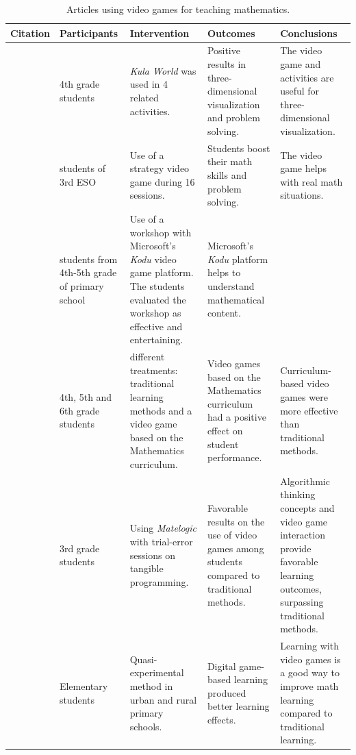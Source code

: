 \documentclass[english]{textolivre}
\begin{document}
\begin{footnotesize}
\begin{longtable}{
  >{\raggedright\arraybackslash}p{2cm}
  >{\raggedright\arraybackslash}p{2.2cm}
  >{\raggedright\arraybackslash}p{2.5cm}
  >{\raggedright\arraybackslash}p{3cm}
  >{\raggedright\arraybackslash}p{3cm}
}
\caption{Articles using video games for teaching mathematics.}\label{tab02}
\\
\toprule
Citation & Participants & Intervention & Outcomes & Conclusions \\
\midrule
\textcite{albarracin_secuencia_2021} & 78 4th grade students & \textit{Kula World} was used in 4 related activities. & Positive results in three-dimensional visualization and problem solving. & The video game and activities are useful for three-dimensional visualization. \\
\textcite{albarracin_taller_2019} & 24 students of 3rd ESO & Use of a strategy video game during 16 sessions. & Students boost their math skills and problem solving. & The video game helps with real math situations. \\
\textcite{alzahrani_evaluation_2013} & 20 students from 4th-5th grade of primary school & Use of a workshop with Microsoft’s \textit{Kodu} video game platform. The students evaluated the workshop as effective and entertaining. & Microsoft’s \textit{Kodu} platform helps to understand mathematical content. \\
\textcite{baig_effect_2020} & 789 4th, 5th and 6th grade students & 2 different treatments: traditional learning methods and a video game based on the Mathematics curriculum. & Video games based on the Mathematics curriculum had a positive effect on student performance. & Curriculum-based video games were more effective than traditional methods. \\
\textcite{barrios_matelogic:_2018} & 3rd grade students & Using \textit{Matelogic} with trial-error sessions on tangible programming. & Favorable results on the use of video games among students compared to traditional methods. & Algorithmic thinking concepts and video game interaction provide favorable learning outcomes, surpassing traditional methods. \\
\textcite{chen_design_2014} & Elementary students & Quasi-experimental method in urban and rural primary schools. & Digital game-based learning produced better learning effects. & Learning with video games is a good way to improve math learning compared to traditional learning. \\

\end{longtable}
\end{footnotesize}
\end{document}
